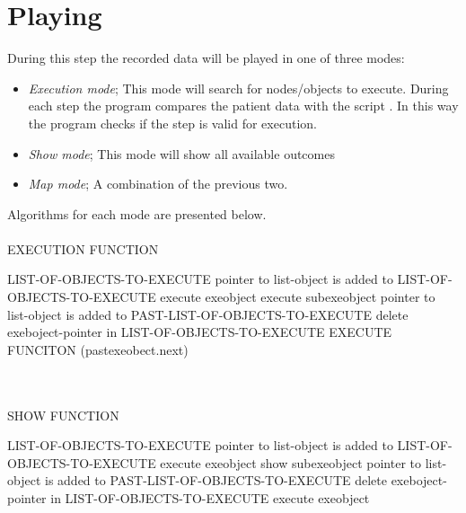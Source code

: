 \documentclass[15pt,a4paper,oneside]{article}
\begin{document}
\section{Playing}
During this step the recorded data will be played in one of three modes:
\begin{itemize}
\item {\it Execution mode}; This mode will search for nodes/objects to execute. During each step the program compares the patient data with the script 
. In this way the program checks if the step is valid for execution.
\item {\it Show mode}; This mode will show all available outcomes
\item {\it Map mode}; A combination of the previous two.
\end{itemize}
Algorithms for each mode are presented below.\\\\
EXECUTION FUNCTION\vspace{-2em}\\
\begin{algorithm}[H]\begin{algorithmic}
\STATE LIST-OF-OBJECTS-TO-EXECUTE
\STATE pointer to list-object is added to LIST-OF-OBJECTS-TO-EXECUTE 
\ENDIF
\ENDFOR
\ENDFOR
{}
\STATE execute exeobject
\STATE execute subexeobject
\ENDFOR
\STATE pointer to list-object is added to PAST-LIST-OF-OBJECTS-TO-EXECUTE 
\STATE delete exeboject-pointer in LIST-OF-OBJECTS-TO-EXECUTE 
\ENDIF
\ENDFOR
{}
\STATE EXECUTE FUNCITON (pastexeobect.next)
\ENDFOR
\end{algorithmic}\end{algorithm}
\ \\
\ \\
SHOW FUNCTION\vspace{-2em}\\
\begin{algorithm}[H]\begin{algorithmic}
\STATE LIST-OF-OBJECTS-TO-EXECUTE
\STATE pointer to list-object is added to LIST-OF-OBJECTS-TO-EXECUTE 
\ENDIF
\ENDFOR
\ENDFOR
{}
\STATE execute exeobject
\STATE show subexeobject
\ENDFOR
\STATE pointer to list-object is added to PAST-LIST-OF-OBJECTS-TO-EXECUTE 
\STATE delete exeboject-pointer in LIST-OF-OBJECTS-TO-EXECUTE 
\ENDFOR
{}
\STATE execute exeobject
\ENDFOR
\end{algorithmic}\end{algorithm}
\end{document}
